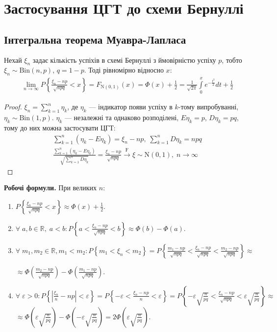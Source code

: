 \section{Застосування ЦГТ до схеми Бернуллі}
\subsection{Інтегральна теорема Муавра-Лапласа}
\begin{theorem*}
    Нехай $\xi_n$ задає кількість успіхів в схемі Бернуллі з ймовірністю успіху $p$, тобто $\xi_n \sim \mathrm{Bin}(n, p)$,
    $q = 1-p$.
    Тоді рівномірно відносно $x$:
    \begin{gather}
        \lim_{n \rightarrow \infty} P \left\{
            \frac{\xi_n - np}{\sqrt{npq}}
            < x
        \right\} = F_{\mathrm{N}(0, 1)}(x) = \Phi(x) + \frac{1}{2} = 
        \frac{1}{\sqrt{2\pi}} \int\limits_0^x e^{-\frac{t^2}{2}} dt + \frac{1}{2}
    \end{gather}
\end{theorem*}
\begin{proof}
    $\xi_n = \sum\limits_{k=1}^n \eta_k$, де $\eta_k$ --- індикатор появи успіху в $k$-тому випробуванні,
    $\eta_k \sim \mathrm{Bin}(1, p)$. $\eta_k$ --- незалежні та однаково розподілені, $E\eta_k = p$, $D\eta_k = pq$,
    тому до них можна застосувати ЦГТ:
    \begin{gather*}
        \sum\limits_{k=1}^n \left( \eta_k - E\eta_k\right) = \xi_n - np, \; \sum\limits_{k=1}^n D\eta_k = n p q \\
        \frac{\sum\limits_{k=1}^n \left( \eta_k - E\eta_k\right)}{\sqrt{\sum\limits_{k=1}^n D\eta_k}} =
         \frac{\xi_n - np}{\sqrt{n p q}} \overset{\mathrm{F}}{\longrightarrow} \xi \sim \mathrm{N}(0, 1), \; n\to \infty
    \end{gather*}
\end{proof}
\noindent\textbf{Робочі формули.} При великих $n$:
\begin{enumerate}
    \item $P\left\{ \frac{\xi_n - np}{\sqrt{n p q}} < x\right\} \approx \Phi(x) + \frac{1}{2}$.
    \item $\forall \; a, b \in \mathbb{R}, \; a<b : P\left\{a < \frac{\xi_n - np}{\sqrt{n p q}} < b\right\} \approx \Phi(b) - \Phi(a)$.
    \item $\forall \; m_1, m_2 \in \mathbb{R}, m_1<m_2 : P\left\{ m_1 < \xi_n < m_2\right\} = 
    P\left\{\frac{m_1 - np}{\sqrt{n p q}} < \frac{\xi_n - np}{\sqrt{n p q}} < \frac{m_2 - np}{\sqrt{n p q}}\right\} \approx$

    $\approx \Phi\left(\frac{m_2 - np}{\sqrt{n p q}}\right) - \Phi\left(\frac{m_1 - np}{\sqrt{n p q}}\right)$.
    \item $\forall \; \varepsilon > 0 : P\left\{ \left|\frac{\xi_n}{n} - np\right| < \varepsilon\right\} = 
    P\left\{-\varepsilon < \frac{\xi_n - np}{n} < \varepsilon\right\} =
    P\left\{-\varepsilon \sqrt{\frac{n}{pq}} < \frac{\xi_n - np}{\sqrt{n p q}} < \varepsilon \sqrt{\frac{n}{pq}}\right\} \approx$
    $\approx \Phi\left( \varepsilon \sqrt{\frac{n}{pq}}\right) - \Phi\left( -\varepsilon \sqrt{\frac{n}{pq}}\right) = 2\Phi\left( \varepsilon \sqrt{\frac{n}{pq}}\right)$.
\end{enumerate}
